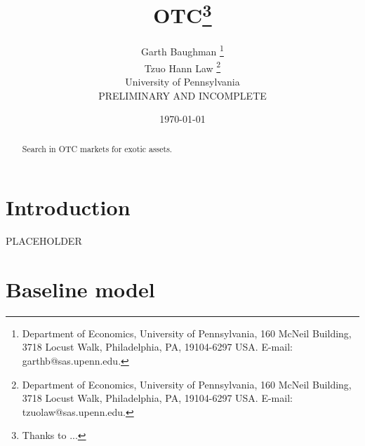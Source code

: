 \documentclass [12pt] {article}
\begin{document}
\title{\bf OTC\thanks{Thanks to ...}}
\author {
Garth Baughman \thanks{Department of Economics, University of Pennsylvania, 160 McNeil Building, 3718 Locust Walk, Philadelphia, PA, 19104-6297 USA. E-mail: garthb@sas.upenn.edu.}\\
Tzuo Hann Law \thanks{Department of Economics, University of Pennsylvania, 160 McNeil Building, 3718 Locust Walk, Philadelphia, PA, 19104-6297 USA. E-mail: tzuolaw@sas.upenn.edu.}
\\University of Pennsylvania \vspace{0.5in} \\ \vspace{0.5in} PRELIMINARY AND INCOMPLETE}
\date{\today}
\maketitle \vspace{-0.7cm}
\thispagestyle{empty}
\begin{abstract}
Search in OTC markets for exotic assets.
\end{abstract}
\newpage


\section{Introduction}\label{section:introduction}
PLACEHOLDER

\section{Baseline model}\label{section:model}
\end{document}
